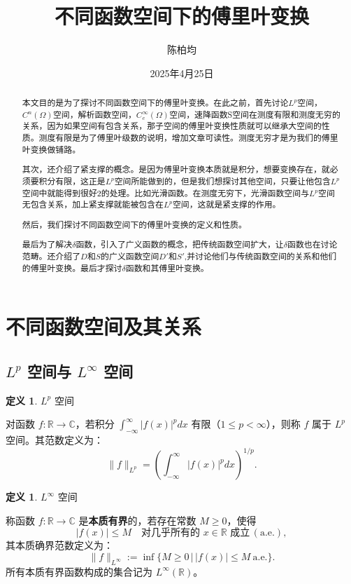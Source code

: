 \documentclass[12pt,a4paper]{article}
\title{不同函数空间下的傅里叶变换}
\author{陈柏均}
\date{2025年4月25日}
\theoremstyle{plain}
\theoremstyle{definition}
\newtheorem{definition}[theorem]{定义}
\theoremstyle{remark}
\begin{document}
	\maketitle
		\begin{abstract}
		本文目的是为了探讨不同函数空间下的傅里叶变换。在此之前，首先讨论$L^p$空间，$C^n(\Omega)$空间，解析函数空间，$C_c^\infty(\Omega)$空间，速降函数S空间在测度有限和测度无穷的关系，因为如果空间有包含关系，那子空间的傅里叶变换性质就可以继承大空间的性质。测度有限是为了傅里叶级数的说明，增加文章可读性。测度无穷才是为我们的傅里叶变换做铺路。
		
		其次，还介绍了紧支撑的概念。是因为傅里叶变换本质就是积分，想要变换存在，就必须要积分有限，这正是$L^p$空间所能做到的，但是我们想探讨其他空间，只要让他包含$L^p$空间中就能得到很好2的处理。比如光滑函数。在测度无穷下，光滑函数空间与$L^p$空间无包含关系，加上紧支撑就能被包含在$L^p$空间，这就是紧支撑的作用。
		
		然后，我们探讨不同函数空间下的傅里叶变换的定义和性质。
		
	    最后为了解决$\delta$函数，引入了广义函数的概念，把传统函数空间扩大，让$\delta$函数也在讨论范畴。还介绍了$D$和$S$的广义函数空间$D'$和$S'$,并讨论他们与传统函数空间的关系和他们的傅里叶变换。最后才探讨$\delta$函数和其傅里叶变换。
	\end{abstract}
	\newpage
	
		\tableofcontents
	\clearpage
	
	
	\section{不同函数空间及其关系}
	\subsection{\texorpdfstring{$L^p$}{Lp} 空间与 \texorpdfstring{$L^\infty$}{L∞} 空间}
	
	\begin{definition}$L^p$ 空间
		
		对函数 $f: \mathbb{R} \to \mathbb{C}$，若积分 $\int_{-\infty}^\infty |f(x)|^p dx$ 有限（$1 \leq p < \infty$），则称 $f$ 属于 $L^p$ 空间。其范数定义为：
		\[
		\|f\|_{L^p} = \left( \int_{-\infty}^\infty |f(x)|^p dx \right)^{1/p}.
		\]
	\end{definition}
	
\begin{definition}$L^\infty$ 空间
	
	称函数 $f: \mathbb{R} \to \mathbb{C}$ 是\textbf{本质有界}的，若存在常数 $M \geq 0$，使得
	\[
	|f(x)| \leq M \quad \text{对几乎所有的 } x \in \mathbb{R} \text{ 成立} \, (\text{a.e.}),
	\]
	其本质确界范数定义为：
	\[
	\|f\|_{L^\infty} := \inf \big\{ M \geq 0 \,\big|\, |f(x)| \leq M \ \text{a.e.} \big\}.
	\]
	所有本质有界函数构成的集合记为 $L^\infty(\mathbb{R})$。
\end{definition}
	
\end{document}
